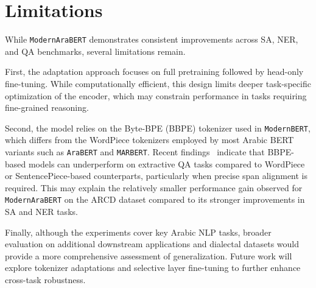 \documentclass[11pt]{article}
\begin{document}
\section{Limitations}
While \texttt{ModernAraBERT} demonstrates consistent improvements across SA, NER, and QA benchmarks, several limitations remain.  

First, the adaptation approach focuses on full pretraining followed by head-only fine-tuning. While computationally efficient, this design limits deeper task-specific optimization of the encoder, which may constrain performance in tasks requiring fine-grained reasoning.  

Second, the model relies on the Byte-BPE (BBPE) tokenizer used in \texttt{ModernBERT}, which differs from the WordPiece tokenizers employed by most Arabic BERT variants such as \texttt{AraBERT} and \texttt{MARBERT}. Recent findings~\cite{qarah2024comprehensive} indicate that BBPE-based models can underperform on extractive QA tasks compared to WordPiece or SentencePiece-based counterparts, particularly when precise span alignment is required. This may explain the relatively smaller performance gain observed for \texttt{ModernAraBERT} on the ARCD dataset compared to its stronger improvements in SA and NER tasks.  

Finally, although the experiments cover key Arabic NLP tasks, broader evaluation on additional downstream applications and dialectal datasets would provide a more comprehensive assessment of generalization. Future work will explore tokenizer adaptations and selective layer fine-tuning to further enhance cross-task robustness.




  



\end{document}
